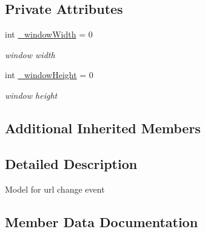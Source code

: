 \subsection*{Private Attributes}
\begin{DoxyCompactItemize}
\item 
int \hyperlink{class_web_analyzer_1_1_models_1_1_message_model_1_1_in_1_1_event_messages_1_1_u_r_l_change_event_message_afc812d9d7f035f0cf2cdbce736e63ade}{\+\_\+window\+Width} = 0
\begin{DoxyCompactList}\small\item\em window width \end{DoxyCompactList}\item 
int \hyperlink{class_web_analyzer_1_1_models_1_1_message_model_1_1_in_1_1_event_messages_1_1_u_r_l_change_event_message_ab9b0f38d44604e01d516fb9d70e54117}{\+\_\+window\+Height} = 0
\begin{DoxyCompactList}\small\item\em window height \end{DoxyCompactList}\end{DoxyCompactItemize}
\subsection*{Additional Inherited Members}


\subsection{Detailed Description}
Model for url change event 



\subsection{Member Data Documentation}
\hypertarget{class_web_analyzer_1_1_models_1_1_message_model_1_1_in_1_1_event_messages_1_1_u_r_l_change_event_message_ab9b0f38d44604e01d516fb9d70e54117}{}
